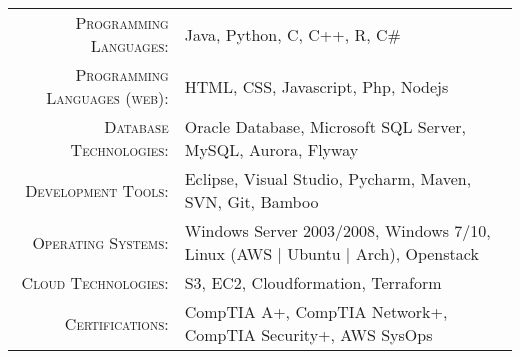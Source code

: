 %
%
%

\renewcommand{\arraystretch}{1.1}

	\begin{tabular}{>{}r>{}p{13cm}} 
		\textsc{Programming Languages:}			&   Java, Python, C, C++, R, C\#\\
		\textsc{Programming Languages (web):}	&   HTML, CSS,  Javascript, Php, Nodejs\\
		\textsc{Database Technologies:}			&   Oracle Database, Microsoft SQL Server, MySQL, Aurora, Flyway \\
		\textsc{Development Tools:}				&   Eclipse, Visual Studio, Pycharm, Maven, SVN, Git, Bamboo\\
		\textsc{Operating Systems:}				&   Windows Server 2003/2008, Windows 7/10,  Linux (AWS | Ubuntu | Arch), Openstack\\
		\textsc{Cloud Technologies:}			&   S3, EC2, Cloudformation, Terraform\\
		\textsc{Certifications:}				&   CompTIA A+, CompTIA Network+, CompTIA Security+, AWS SysOps
	
		
	\end{tabular} 